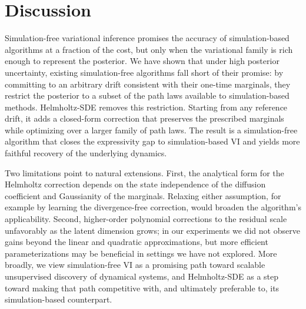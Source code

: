 \section{Discussion}\label{sec:discussion}
Simulation-free variational inference promises the accuracy of simulation-based algorithms at a fraction of the cost, but only when the variational family is rich enough to represent the posterior.
We have shown that under high posterior uncertainty, existing simulation-free algorithms fall short of their promise: by committing to an arbitrary drift consistent with their one-time marginals, they restrict the posterior to a subset of the path laws available to simulation-based methods. 
Helmholtz-SDE removes this restriction. 
Starting from any reference drift, it adds a closed-form correction that preserves the prescribed marginals while optimizing over a larger family of path laws. 
The result is a simulation-free algorithm that closes the expressivity gap to simulation-based VI and yields more faithful recovery of the underlying dynamics.

Two limitations point to natural extensions. 
First, the analytical form for the Helmholtz correction depends on the state independence of the diffusion coefficient and Gaussianity of the marginals. 
Relaxing either assumption, for example by learning the divergence-free correction, would broaden the algorithm's applicability.
Second, higher-order polynomial corrections to the residual scale unfavorably as the latent dimension grows; in our experiments we did not observe gains beyond the linear and quadratic approximations, but more efficient parameterizations may be beneficial in settings we have not explored. 
More broadly, we view simulation-free VI as a promising path toward scalable unsupervised discovery of dynamical systems, and Helmholtz-SDE as a step toward making that path competitive with, and ultimately preferable to, its simulation-based counterpart.